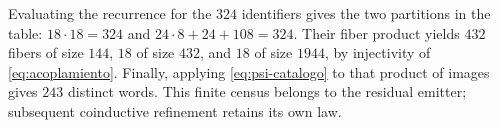 Evaluating the recurrence for the \(324\) identifiers gives the two
partitions in the table: \(18\cdot18=324\) and
\(24\cdot8+24+108=324\). Their fiber product yields \(432\) fibers of
size \(144\), \(18\) of size \(432\), and \(18\) of size \(1944\),
by injectivity of \eqref{eq:acoplamiento}. Finally, applying
\eqref{eq:psi-catalogo} to that product of images gives \(243\)
distinct words. This finite census belongs to the residual emitter;
subsequent coinductive refinement retains its own law.

